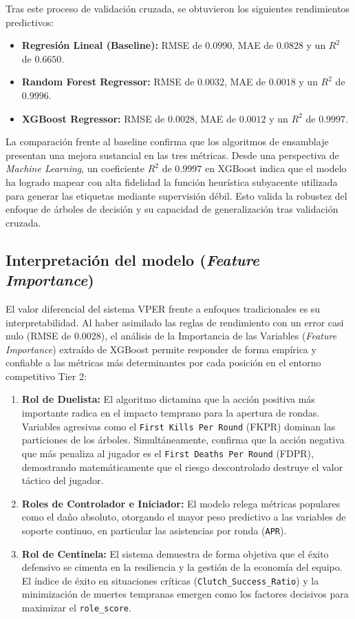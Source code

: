 \documentclass{ULBreport} %
\begin{document}
Tras este proceso de validación cruzada, se obtuvieron los siguientes rendimientos predictivos:

\begin{itemize}
    \item \textbf{Regresión Lineal (Baseline):} RMSE de $0.0990$, MAE de $0.0828$ y un $R^2$ de $0.6650$.
    \item \textbf{Random Forest Regressor:} RMSE de $0.0032$, MAE de $0.0018$ y un $R^2$ de $0.9996$.
    \item \textbf{XGBoost Regressor:} RMSE de $0.0028$, MAE de $0.0012$ y un $R^2$ de $0.9997$.
\end{itemize}

La comparación frente al baseline confirma que los algoritmos de ensamblaje presentan una mejora sustancial en las tres métricas. Desde una perspectiva de \textit{Machine Learning}, un coeficiente $R^2$ de $0.9997$ en XGBoost indica que el modelo ha logrado mapear con alta fidelidad la función heurística subyacente utilizada para generar las etiquetas mediante supervisión débil. Esto valida la robustez del enfoque de árboles de decisión y su capacidad de generalización tras validación cruzada.
\subsection{Interpretación del modelo (\textit{Feature Importance})}

El valor diferencial del sistema VPER frente a enfoques tradicionales es su interpretabilidad. Al haber asimilado las reglas de rendimiento con un error casi nulo (RMSE de 0.0028), el análisis de la Importancia de las Variables (\textit{Feature Importance}) extraído de XGBoost permite responder de forma empírica y confiable a las métricas más determinantes por cada posición en el entorno competitivo Tier 2:

\begin{enumerate}
    \item \textbf{Rol de Duelista:} El algoritmo dictamina que la acción positiva más importante radica en el impacto temprano para la apertura de rondas. Variables agresivas como el \texttt{First Kills Per Round} (FKPR) dominan las particiones de los árboles. Simultáneamente, confirma que la acción negativa que más penaliza al jugador es el \texttt{First Deaths Per Round} (FDPR), demostrando matemáticamente que el riesgo descontrolado destruye el valor táctico del jugador.
    \item \textbf{Roles de Controlador e Iniciador:} El modelo relega métricas populares como el daño absoluto, otorgando el mayor peso predictivo a las variables de soporte continuo, en particular las asistencias por ronda (\texttt{APR}).
    \item \textbf{Rol de Centinela:} El sistema demuestra de forma objetiva que el éxito defensivo se cimenta en la resiliencia y la gestión de la economía del equipo. El índice de éxito en situaciones críticas (\texttt{Clutch\_Success\_Ratio}) y la minimización de muertes tempranas emergen como los factores decisivos para maximizar el \texttt{role\_score}.
\end{enumerate}
\end{document}
